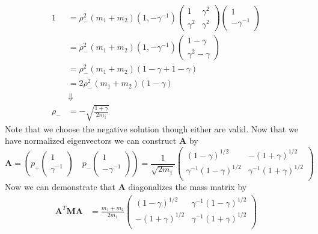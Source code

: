 \documentclass[11pt]{article}
\numberwithin{equation}{section}
\begin{document}
\begin{enumerate}[(a)]
\begin{align*}
1 &= \rho_-^2(m_1+m_2)(1,-\gamma^{-1})\left(\begin{array}{cc}
                1             &\gamma^2\\
                \gamma^2      &\gamma^2
           \end{array}\right)\left(\begin{array}{c}1\\ -\gamma^{-1}\end{array}\right)\\
&= \rho_-^2(m_1+m_2)(1,-\gamma^{-1})\left(\begin{array}{c}
                1-\gamma\\
                \gamma^2-\gamma 
           \end{array}\right)\\
&= \rho_-^2(m_1+m_2)(1-\gamma+1-\gamma)\\
&= 2\rho_-^2(m_1+m_2)(1-\gamma)\\
&\Downarrow\\
\rho_- &= -\sqrt{\frac{1+\gamma}{2m_1}}
\end{align*}
Note that we choose the negative solution though either are valid. Now that we have normalized eigenvectors we can construct $\mathbf{A}$ by
$$\mathbf{A} = \left(p_+\left(\begin{array}{c}1\\ \gamma^{-1}\end{array}\right)
                    \quad p_-\left(\begin{array}{c}1\\ -\gamma^{-1}\end{array}\right)\right) 
= \frac{1}{\sqrt{2m_1}}\left(\begin{array}{cc} 
                         (1-\gamma)^{1/2}          &-(1+\gamma)^{1/2}\\
                         \gamma^{-1}(1-\gamma)^{1/2}    &\gamma^{-1}(1+\gamma)^{1/2}\\
\end{array}\right)$$
Now we can demonstrate that $\mathbf{A}$ diagonalizes the mass matrix by
\begin{align*}
\mathbf{A}^T\mathbf{M}\mathbf{A} &= \frac{m_1+m_2}{2m_1}
                     \left(\begin{array}{cc} 
                         (1-\gamma)^{1/2}          &\gamma^{-1}(1-\gamma)^{1/2}\\
                         -(1+\gamma)^{1/2}         &\gamma^{-1}(1+\gamma)^{1/2}\\
                      \end{array}\right)

\end{align*}
\end{enumerate}
\end{document}
